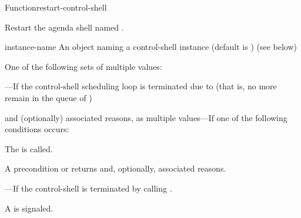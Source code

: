 \documentclass[10pt,twoside,english,pdftex]{article}
\begin{document}

\begin{functiondoc}{Function}{restart-control-shell}{%
     
    \returns{} \superstar}
%
%
%

\fnsyntax

\fnpurpose Restart the agenda shell named .

\fnpackage {}

\fnmodule {}

%
\fnargs
\begin{args}{instance-name}
 An object naming a control-shell instance (default is 
) 
\arg[results] (see below)
\end{args}

\fnreturns
One of the following sets of multiple values: 
\begin{tightitemize}
\item {}---If the control-shell scheduling loop is terminated
  due to  (that is, no more  remain 
  in the queue of ) 
\item {} and (optionally) associated reasons, as multiple
  values---If one of the following conditions occurs:
\begin{tightitemize}
\item The \textbf{}  is
  called.
\item A precondition  or  
  returns  and, optionally, associated reasons.
\end{tightitemize}
\item {}---If the control-shell is terminated by
  calling \textbf{}.
\end{tightitemize}

\fnevents
{}%
%
%
%
%
%
A  is signaled.
 
\fnerrors
\threadsnotstarted


\end{functiondoc}
\end{document}
